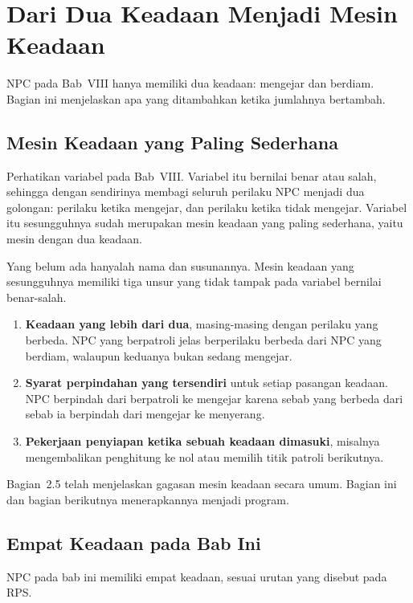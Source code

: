 \section{Dari Dua Keadaan Menjadi Mesin Keadaan}
\label{sec:dua-keadaan}

NPC pada Bab~VIII hanya memiliki dua keadaan: mengejar dan berdiam. Bagian ini
menjelaskan apa yang ditambahkan ketika jumlahnya bertambah.

\subsection{Mesin Keadaan yang Paling Sederhana}

Perhatikan variabel  pada Bab~VIII. Variabel itu bernilai
benar atau salah, sehingga dengan sendirinya membagi seluruh perilaku NPC
menjadi dua golongan: perilaku ketika mengejar, dan perilaku ketika tidak
mengejar. Variabel itu sesungguhnya sudah merupakan mesin keadaan yang paling
sederhana, yaitu mesin dengan dua keadaan.

Yang belum ada hanyalah nama dan susunannya. Mesin keadaan yang sesungguhnya
memiliki tiga unsur yang tidak tampak pada variabel bernilai benar-salah.

\begin{enumerate}
  \item \textbf{Keadaan yang lebih dari dua}, masing-masing dengan perilaku
        yang berbeda. NPC yang berpatroli jelas berperilaku berbeda dari NPC
        yang berdiam, walaupun keduanya bukan sedang mengejar.
  \item \textbf{Syarat perpindahan yang tersendiri} untuk setiap pasangan
        keadaan. NPC berpindah dari berpatroli ke mengejar karena sebab yang
        berbeda dari sebab ia berpindah dari mengejar ke menyerang.
  \item \textbf{Pekerjaan penyiapan ketika sebuah keadaan dimasuki}, misalnya
        mengembalikan penghitung ke nol atau memilih titik patroli berikutnya.
\end{enumerate}

Bagian~2.5 telah menjelaskan gagasan mesin keadaan secara umum. Bagian ini dan
bagian berikutnya menerapkannya menjadi program.

\subsection{Empat Keadaan pada Bab Ini}

NPC pada bab ini memiliki empat keadaan, sesuai urutan yang disebut pada
RPS.

